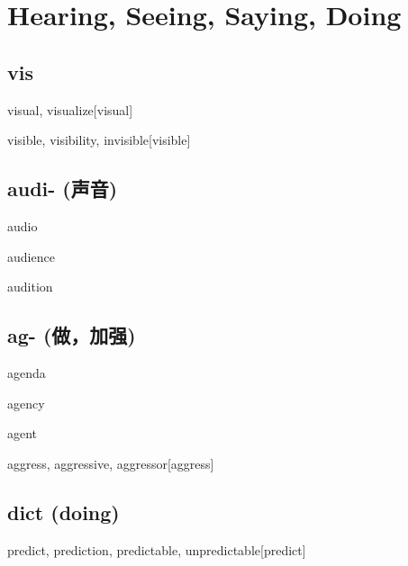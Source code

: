 \chapter{Hearing, Seeing, Saying, Doing}

\section{vis}
\begin{RefWord}{visual, visualize}[visual]
\end{RefWord}

\begin{RefWord}{visible, visibility, invisible}[visible]
\end{RefWord}

\section{audi- (声音)}
\begin{RefWord}{audio}
\end{RefWord}

\begin{RefWord}{audience}
\end{RefWord}

\begin{RefWord}{audition}
\end{RefWord}

\section{{ag- (做，加强)}}

\begin{RefWord}{agenda}
\end{RefWord}

\begin{RefWord}{agency}
\end{RefWord}

\begin{RefWord}{agent}
\end{RefWord}

\begin{RefWord}{aggress, aggressive, aggressor}[aggress]
\end{RefWord}

\section{dict (doing)}

\begin{RefWord}{predict, prediction, predictable, unpredictable}[predict]
\end{RefWord}


